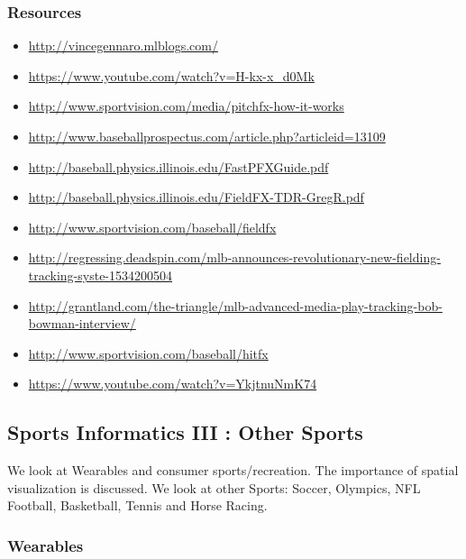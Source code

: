 
\subsubsection{Resources}\label{resources-1}

\begin{itemize}
\item
  \url{http://vincegennaro.mlblogs.com/}
\item
  \url{https://www.youtube.com/watch?v=H-kx-x_d0Mk}
\item
  \url{http://www.sportvision.com/media/pitchfx-how-it-works}
\item
  \url{http://www.baseballprospectus.com/article.php?articleid=13109}
\item
  \url{http://baseball.physics.illinois.edu/FastPFXGuide.pdf}
\item
  \url{http://baseball.physics.illinois.edu/FieldFX-TDR-GregR.pdf}
\item
  \url{http://www.sportvision.com/baseball/fieldfx}
\item
  \url{http://regressing.deadspin.com/mlb-announces-revolutionary-new-fielding-tracking-syste-1534200504}
\item
  \url{http://grantland.com/the-triangle/mlb-advanced-media-play-tracking-bob-bowman-interview/}
\item
  \url{http://www.sportvision.com/baseball/hitfx}
\item
  \url{https://www.youtube.com/watch?v=YkjtnuNmK74}
\end{itemize}

\subsection{Sports Informatics III : Other
Sports}\label{sports-informatics-iii-other-sports}

We look at Wearables and consumer sports/recreation. The importance of
spatial visualization is discussed. We look at other Sports: Soccer,
Olympics, NFL Football, Basketball, Tennis and Horse Racing.




\subsubsection{Wearables}\label{wearables}


